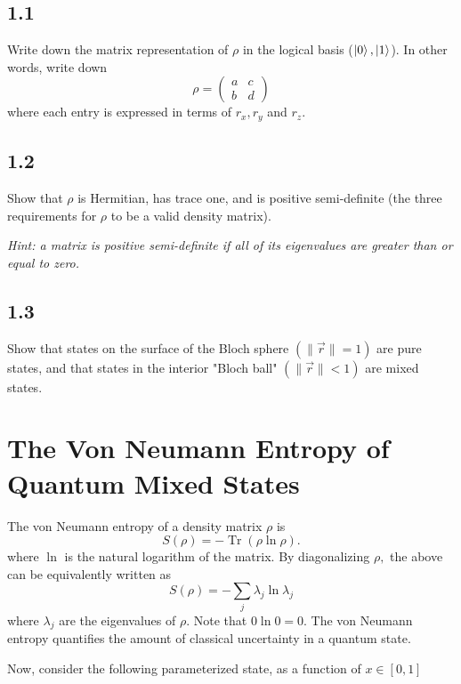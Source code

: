 \documentclass[11pt]{article}
\DeclareMathOperator{\Tr}{Tr} %
\begin{document}
\subsection{1.1}
Write down the matrix representation of $\rho$ in the logical basis ($\ket{0}, \ket{1}$). In other words, write down
\begin{equation*}
    \rho = \begin{pmatrix} a & c \\ b & d \end{pmatrix}
\end{equation*}
where each entry is expressed in terms of $r_x, r_y$ and $r_z$.

\subsection{1.2}
Show that $\rho$ is Hermitian, has trace one, and is positive semi-definite (the three requirements for $\rho$ to be a valid density matrix).

\textit{Hint: a matrix is positive semi-definite if all of its eigenvalues are greater than or equal to zero.}

\subsection{1.3}
Show that states on the surface of the Bloch sphere $(\|\vec{r}\| = 1)$ are pure states, and that states in the interior "Bloch ball" $(\|\vec{r}\| < 1)$ are mixed states.

\section{The Von Neumann Entropy of Quantum Mixed States}
The von Neumann entropy of a density matrix $\rho$ is
\begin{equation*}
    S(\rho) = - \Tr(\rho \ln \rho).
\end{equation*}
where $\ln$ is the natural logarithm of the matrix. By diagonalizing $\rho,$ the above can be equivalently written as
\begin{equation*}
    S(\rho) = - \sum_{j} \lambda_j \ln \lambda_j
\end{equation*}
where $\lambda_j$ are the eigenvalues of $\rho$. Note that $0 \ln 0 = 0$. The von Neumann entropy quantifies the amount of classical uncertainty in a quantum state.

Now, consider the following parameterized state, as a function of $x \in [0, 1]$
\end{document}

